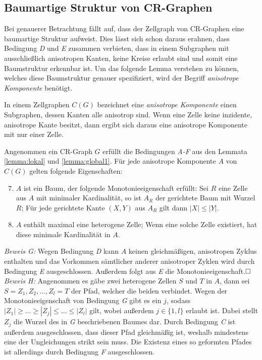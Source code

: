 \subsection{Baumartige Struktur von CR-Graphen}
Bei genauerer Betrachtung fällt auf, dass der Zellgraph von CR-Graphen eine baumartige Struktur aufweist.
Dies lässt sich schon daraus erahnen, dass Bedingung \emph{D} und \emph{E} zusammen verbieten, dass in einem Subgraphen mit ausschließlich anisotropen Kanten, keine Kreise erlaubt sind und somit eine Baumstruktur erkennbar ist.
Um das folgende Lemma verstehen zu können, welches diese Baumstruktur genauer spezifiziert, wird der Begriff \emph{anisotrope Komponente} benötigt.
\begin{Definition}
	In einem Zellgraphen $C(G)$ bezeichnet eine \emph{anisotrope Komponente} einen Subgraphen, dessen Kanten alle anisotrop sind.
	Wenn eine Zelle keine inzidente, anisotrope Kante besitzt, dann ergibt sich daraus eine anisotrope Komponente mit nur einer Zelle.
\end{Definition}

\begin{Lemma}
	Angenommen ein CR-Graph $G$ erfüllt die Bedingungen \emph{A-F} aus den Lemmata \ref{lemma:lokal} und \ref{lemma:global1}.
	Für jede anisotrope Komponente $A$ von $C(G)$ gelten folgende Eigenschaften:
	
	\begin{enumerate}[label=(\Alph*)]
		\setcounter{enumi}{6}
		\item $A$ ist ein Baum, der folgende Monotonieeigenschaft erfüllt: Sei $R$ eine Zelle aus $A$ mit minimaler Kardinalität, so ist $A_R$ der gerichtete Baum mit Wurzel $R$; Für jede gerichtete Kante $(X,Y)$ aus $A_R$ gilt dann $|X|\leq |Y|$.
		\item $A$ enthält maximal eine heterogene Zelle; Wenn eine solche Zelle existiert, hat diese minimale Kardinalität in $A$.
	\end{enumerate}
	\label{lemma:global2}
\end{Lemma}

\emph{Beweis G:} Wegen Bedingung \emph{D} kann $A$ keinen gleichmäßigen, anisotropen Zyklus enthalten und das Vorkommen sämtlicher anderer anisotroper Zyklen wird durch Bedingung \emph{E} ausgeschlossen. Außerdem folgt aus \emph{E} die Monotonieeigenschaft.$\hfill\square$\\

\emph{Beweis H:} Angenommen es gäbe zwei heterogene Zellen $S$ und $T$ in $A$, dann sei $S=Z_1,Z_2,...,Z_l=T$ der Pfad, welcher die beiden verbindet.
Wegen der Monotonieeigenschaft von Bedingung \emph{G} gibt es ein $j$, sodass $|Z_1|\geq ... \geq |Z_j|\leq ... \leq |Z_l|$ gilt, wobei außerdem $j\in \{1,l\}$ erlaubt ist.
Dabei stellt $Z_j$ die Wurzel des in \emph{G} beschriebenen Baumes dar.
Durch Bedingung \emph{C} ist außerdem ausgeschlossen, dass dieser Pfad gleichmäßig ist, weshalb mindestens eine der Ungleichungen strikt sein muss.
Die Existenz eines so geformten Pfades ist allerdings durch Bedingung \emph{F} ausgeschlossen.

